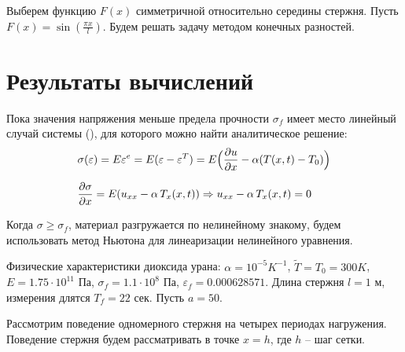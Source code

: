 \documentclass[12pt,a4paper]{article}
\begin{document}
  Выберем функцию $F(x)$ симметричной относительно середины стержня. Пусть $F(x) = \sin(\tfrac{\pi x}{l})$. Будем решать задачу методом конечных разностей.

  \section{Результаты вычислений}

  Пока значения напряжения меньше предела прочности $\sigma_f$ имеет место линейный случай системы (), для которого можно найти аналитическое решение:
  \begin{equation}
    \begin{split}
      &\sigma(\varepsilon) = E\varepsilon^e = E(\varepsilon - \varepsilon^T) = E \Bigl(\dfrac{\partial u}{\partial x} - \alpha(T(x,t) - T_0 ) \Bigr) \\[0.7em]
      &\dfrac{\partial \sigma}{\partial x} = E(u_{xx} - \alpha \, T_x (x, t)) \Rightarrow u_{xx} - \alpha \, T_x (x, t) = 0
    \end{split}
    \label{linearSigma}
  \end{equation}

  Когда $\sigma \geq \sigma_f$, материал разгружается по нелинейному знакому, будем использовать метод Ньютона для линеаризации нелинейного уравнения.

  Физические характеристики диоксида урана: $\alpha = 10^{-5} K^{-1}$, $\widetilde{T} = T_0 = 300 K$, $E = 1.75 \cdot 10^{11}$ Па, $\sigma_f = 1.1 \cdot 10^8$ Па, $\varepsilon_f = 0.000628571$. Длина стержня $l = 1$ м, измерения длятся $T_f = 22$ сек. Пусть $a = 50$.

  Рассмотрим поведение одномерного стержня на четырех периодах нагружения. Поведение стержня будем рассматривать в точке $x = h$, где $h$ -- шаг сетки.
\end{document}

